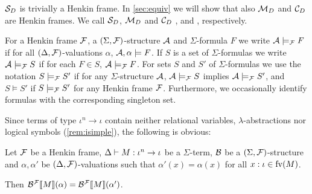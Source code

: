 \documentclass[a4paper,twoside,notitlepage,openright,11pt]{report}
\begin{document}
\begin{example}
  $\mathcal S_D$ is trivially a Henkin frame. In \cref{sec:equiv} we will show that also $\mathcal M_D$ and $\mathcal C_D$ are Henkin frames. We call $\mathcal S_D$, $\mathcal M_D$ and $\mathcal C_D$ ,  and , respectively.
\end{example}

For a Henkin frame $\mathcal F$, a $(\Sigma,\mathcal F)$-structure $\mathcal A$ and $\Sigma$-formula $F$ we write $\mathcal A\models_\mathcal F F$ if for all $(\Delta,\mathcal F)$-valuations $\alpha$, $\mathcal A,\alpha\models F$. If $S$ is a set of $\Sigma$-formulas we write $\mathcal A\models_\mathcal F S$ if for each $F\in S$, $\mathcal A\models_\mathcal F F$.
For sets $S$ and $S'$ of $\Sigma$-formulas we use the notation $S\models_\mathcal F S'$ if for any $\Sigma$-structure $\mathcal A$, $\mathcal A\models_\mathcal F S$ implies $\mathcal A\models_\mathcal F S'$, and $S\models S'$ if $S\models_\mathcal F S'$ for any Henkin frame $\mathcal F$. Furthermore, we occasionally identify formulas with the corresponding singleton set.

Since terms of type $\iota^n\to\iota$ contain neither relational variables, $\lambda$-abstractions nor logical symbols (\cref{rem:isimple}), the following is obvious:
\begin{lemma}
  \label{lem:folirr}
  Let $\mathcal F$ be a Henkin frame, $\Delta\vdash M:\iota^n\to\iota$ be a $\Sigma$-term, $\mathcal B$ be a $(\Sigma,\mathcal F)$-structure and $\alpha,\alpha'$ be $(\Delta,\mathcal F)$-valuations such that $\alpha'(x)=\alpha(x)$ for all $x:\iota\in\operatorname{fv}(M)$.

  Then ${\mathcal B}^\mathcal F\llbracket M\rrbracket(\alpha)={\mathcal B}^\mathcal F\llbracket M\rrbracket(\alpha')$.
\end{lemma}
\end{document}
